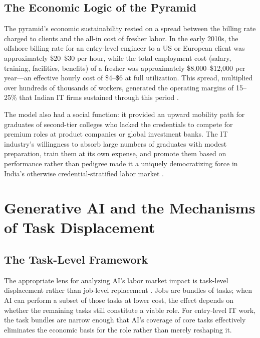 \documentclass[conference]{IEEEtran}
\begin{document}
\subsection{The Economic Logic of the Pyramid}

The pyramid's economic sustainability rested on a spread between the billing rate charged to clients and the all-in cost of fresher labor. In the early 2010s, the offshore billing rate for an entry-level engineer to a US or European client was approximately \$20--\$30 per hour, while the total employment cost (salary, training, facilities, benefits) of a fresher was approximately \$8,000--\$12,000 per year---an effective hourly cost of \$4--\$6 at full utilization. This spread, multiplied over hundreds of thousands of workers, generated the operating margins of 15--25\% that Indian IT firms sustained through this period \cite{patibandla2006evolution}.

The model also had a social function: it provided an upward mobility path for graduates of second-tier colleges who lacked the credentials to compete for premium roles at product companies or global investment banks. The IT industry's willingness to absorb large numbers of graduates with modest preparation, train them at its own expense, and promote them based on performance rather than pedigree made it a uniquely democratizing force in India's otherwise credential-stratified labor market \cite{upadhya2007software}.

\section{Generative AI and the Mechanisms of Task Displacement}
\label{sec:mechanisms}

\subsection{The Task-Level Framework}

The appropriate lens for analyzing AI's labor market impact is task-level displacement rather than job-level replacement \cite{autor2003skill, acemoglu2022tasks}. Jobs are bundles of tasks; when AI can perform a subset of those tasks at lower cost, the effect depends on whether the remaining tasks still constitute a viable role. For entry-level IT work, the task bundles are narrow enough that AI's coverage of core tasks effectively eliminates the economic basis for the role rather than merely reshaping it.
\end{document}
